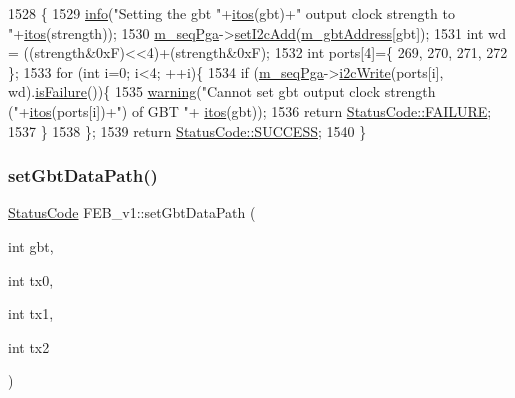\begin{DoxyCode}
1528                                                            \{
1529   \hyperlink{classObject_a644fd329ea4cb85f54fa6846484b84a8}{info}(\textcolor{stringliteral}{"Setting the gbt "}+\hyperlink{Tools_8h_af330027dbdafb9a30768b3613c553e60}{itos}(gbt)+\textcolor{stringliteral}{" output clock strength to "}+\hyperlink{Tools_8h_af330027dbdafb9a30768b3613c553e60}{itos}(strength));
1530   \hyperlink{classFEB__v1_a6c7804ac86796f233a8393043adf2e77}{m\_seqPga}->\hyperlink{classSeqPGA_a4ef334e4d2cb417b49033dce951728cd}{setI2cAdd}(\hyperlink{classFEB__v1_ac625855df976f16694178f1a4c0eef1e}{m\_gbtAddress}[gbt]);
1531   \textcolor{keywordtype}{int} wd = ((strength&0xF)<<4)+(strength&0xF);
1532   \textcolor{keywordtype}{int} ports[4]=\{ 269, 270, 271, 272 \};
1533   \textcolor{keywordflow}{for} (\textcolor{keywordtype}{int} i=0; i<4; ++i)\{
1534     \textcolor{keywordflow}{if} (\hyperlink{classFEB__v1_a6c7804ac86796f233a8393043adf2e77}{m\_seqPga}->\hyperlink{classSeqPGA_a429076ca3a4ece94182bd95c623bb9d0}{i2cWrite}(ports[i], wd).\hyperlink{classStatusCode_a5dd22dc6eb2c52fc4cabc58f6dea2eb7}{isFailure}())\{
1535       \hyperlink{classObject_a65cd4fda577711660821fd2cd5a3b4c9}{warning}(\textcolor{stringliteral}{"Cannot set gbt output clock strength ("}+\hyperlink{Tools_8h_af330027dbdafb9a30768b3613c553e60}{itos}(ports[i])+\textcolor{stringliteral}{") of GBT "}+
      \hyperlink{Tools_8h_af330027dbdafb9a30768b3613c553e60}{itos}(gbt));
1536       \textcolor{keywordflow}{return} \hyperlink{classStatusCode_a6f565cbeadc76d14c72f047e5e85eb4ba3da73d4c469762eb9d3c960368252b26}{StatusCode::FAILURE};
1537     \}
1538   \};
1539   \textcolor{keywordflow}{return} \hyperlink{classStatusCode_a6f565cbeadc76d14c72f047e5e85eb4badd0da38d3ba0d922efd1f4619bc37ad8}{StatusCode::SUCCESS};
1540 \}
\end{DoxyCode}
\mbox{\label{classFEB__v1_aabd651b11d1119ce3a19b7fb083cca78}} 
\subsubsection{\texorpdfstring{set\+Gbt\+Data\+Path()}{setGbtDataPath()}}
{\footnotesize\ttfamily \hyperlink{classStatusCode}{Status\+Code} F\+E\+B\+\_\+v1\+::set\+Gbt\+Data\+Path (\begin{DoxyParamCaption}\item[{int}]{gbt,  }\item[{int}]{tx0,  }\item[{int}]{tx1,  }\item[{int}]{tx2 }\end{DoxyParamCaption})}




